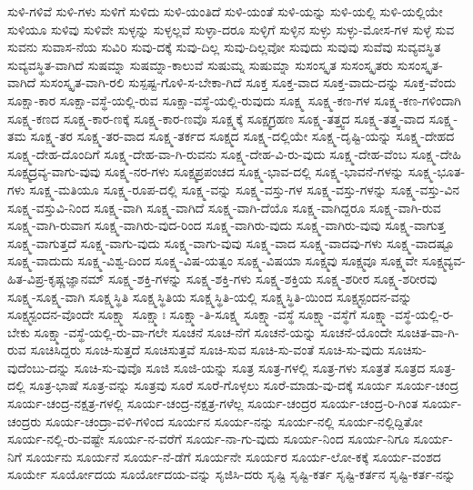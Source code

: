 {ಸುಳಿ-ಗಳಿವೆ
ಸುಳಿ-ಗಳು
ಸುಳಿಗೆ
ಸುಳಿದು
ಸುಳಿ-ಯಂತಿದೆ
ಸುಳಿ-ಯಂತೆ
ಸುಳಿ-ಯನ್ನು
ಸುಳಿ-ಯಲ್ಲಿ
ಸುಳಿ-ಯಲ್ಲಿಯೇ
ಸುಳಿಯೂ
ಸುಳಿವು
ಸುಳಿವೇ
ಸುಳ್ಳನ್ನು
ಸುಳ್ಳಲ್ಲವೆ
ಸುಳ್ಳಾ-ದರೂ
ಸುಳ್ಳಿಗೆ
ಸುಳ್ಳಿನ
ಸುಳ್ಳು
ಸುಳ್ಳು-ಮೋಸ-ಗಳ
ಸುಳ್ಳೆ
ಸುವ
ಸುವನು
ಸುವಾಸ-ನೆಯ
ಸುವಿರಿ
ಸುವು-ದಕ್ಕೆ
ಸುವು-ದಿಲ್ಲ
ಸುವು-ದಿಲ್ಲವೋ
ಸುವುದು
ಸುವುವು
ಸುವೆವು
ಸುವ್ಯವಸ್ಥಿತ
ಸುವ್ಯವಸ್ಥಿತ-ವಾಗಿದೆ
ಸುಷಮ್ನಾ
ಸುಷಮ್ನಾ-ಕಾಲುವೆ
ಸುಷುಮ್ನ
ಸುಷುಮ್ನಾ
ಸುಸಂಸ್ಕೃತ
ಸುಸಂಸ್ಕೃತರು
ಸುಸಂಸ್ಕೃತ-ವಾಗಿದೆ
ಸುಸಂಸ್ಕೃತ-ವಾಗಿ-ರಲಿ
ಸುಸ್ಪಷ್ಟ-ಗೊಳಿ-ಸ-ಬೇಕಾ-ಗಿದೆ
ಸೂಕ್ತ
ಸೂಕ್ತ-ವಾದ
ಸೂಕ್ತ-ವಾದು-ದನ್ನು
ಸೂಕ್ತ-ವೆಂದು
ಸೂಕ್ಷಾ-ಕಾರ
ಸೂಕ್ಷಾ-ವಸ್ಥೆ-ಯಲ್ಲಿ-ರುವ
ಸೂಕ್ಷಾ-ವಸ್ಥೆ-ಯಲ್ಲಿ-ರುವುದು
ಸೂಕ್ಷ್ಮ
ಸೂಕ್ಷ್ಮ-ಕಣ-ಗಳ
ಸೂಕ್ಷ್ಮ-ಕಣ-ಗಳಿಂದಾಗಿ
ಸೂಕ್ಷ್ಮ-ಕಣದ
ಸೂಕ್ಷ್ಮ-ಕಾರ-ಣಕ್ಕೆ
ಸೂಕ್ಷ್ಮ-ಕಾರ-ಣವೊ
ಸೂಕ್ಷ್ಮಕ್ಕೆ
ಸೂಕ್ಷ್ಮಗ್ರಹಣ
ಸೂಕ್ಷ್ಮ-ತತ್ತ್ವದ
ಸೂಕ್ಷ್ಮ-ತತ್ತ್ವ-ವಾದ
ಸೂಕ್ಷ್ಮ-ತಮ
ಸೂಕ್ಷ್ಮ-ತರ
ಸೂಕ್ಷ್ಮ-ತರ-ವಾದ
ಸೂಕ್ಷ್ಮ-ತರ್ಕದ
ಸೂಕ್ಷ್ಮದ
ಸೂಕ್ಷ್ಮ-ದಲ್ಲಿಯೇ
ಸೂಕ್ಷ್ಮ-ದೃಷ್ಟಿ-ಯನ್ನು
ಸೂಕ್ಷ್ಮ-ದೇಹದ
ಸೂಕ್ಷ್ಮ-ದೇಹ-ದೊಂದಿಗೆ
ಸೂಕ್ಷ್ಮ-ದೇಹ-ವಾ-ಗಿ-ರುವನು
ಸೂಕ್ಷ್ಮ-ದೇಹ-ವಿ-ರು-ವುದು
ಸೂಕ್ಷ್ಮ-ದೇಹ-ವೆಂಬ
ಸೂಕ್ಷ್ಮ-ದೇಹಿ
ಸೂಕ್ಷ್ಮದ್ರವ್ಯ-ವಾಗು-ವುವು
ಸೂಕ್ಷ್ಮ-ನರ-ಗಳು
ಸೂಕ್ಷ್ಮಪ್ರಪಂಚದ
ಸೂಕ್ಷ್ಮ-ಭಾವ-ದಲ್ಲಿ
ಸೂಕ್ಷ್ಮ-ಭಾವನೆ-ಗಳನ್ನು
ಸೂಕ್ಷ್ಮ-ಭೂತ-ಗಳು
ಸೂಕ್ಷ್ಮ-ಮತಿಯೂ
ಸೂಕ್ಷ್ಮ-ರೂಪ-ದಲ್ಲಿ
ಸೂಕ್ಷ್ಮ-ವನ್ನು
ಸೂಕ್ಷ್ಮ-ವಸ್ತು-ಗಳ
ಸೂಕ್ಷ್ಮ-ವಸ್ತು-ಗಳನ್ನು
ಸೂಕ್ಷ್ಮ-ವಸ್ತು-ವಿನ
ಸೂಕ್ಷ್ಮ-ವಸ್ತುವಿ-ನಿಂದ
ಸೂಕ್ಷ್ಮ-ವಾಗಿ
ಸೂಕ್ಷ್ಮ-ವಾಗಿದೆ
ಸೂಕ್ಷ್ಮ-ವಾಗಿ-ದೆಯೊ
ಸೂಕ್ಷ್ಮ-ವಾಗಿದ್ದರೂ
ಸೂಕ್ಷ್ಮ-ವಾಗಿ-ರುವ
ಸೂಕ್ಷ್ಮ-ವಾಗಿ-ರುವಾಗ
ಸೂಕ್ಷ್ಮ-ವಾಗಿರು-ವುದ-ರಿಂದ
ಸೂಕ್ಷ್ಮ-ವಾಗಿರು-ವುದು
ಸೂಕ್ಷ್ಮ-ವಾಗಿರು-ವುವು
ಸೂಕ್ಷ್ಮ-ವಾಗುತ್ತ
ಸೂಕ್ಷ್ಮ-ವಾಗುತ್ತದೆ
ಸೂಕ್ಷ್ಮ-ವಾಗು-ವುದು
ಸೂಕ್ಷ್ಮ-ವಾಗು-ವುವು
ಸೂಕ್ಷ್ಮ-ವಾದ
ಸೂಕ್ಷ್ಮ-ವಾದವು-ಗಳು
ಸೂಕ್ಷ್ಮ-ವಾದಷ್ಟೂ
ಸೂಕ್ಷ್ಮ-ವಾದುದು
ಸೂಕ್ಷ್ಮ-ವಿಶ್ವ-ದಿಂದ
ಸೂಕ್ಷ್ಮ-ವಿಷ-ಯತ್ವಂ
ಸೂಕ್ಷ್ಮ-ವಿಷಯಾ
ಸೂಕ್ಷ್ಮವು
ಸೂಕ್ಷ್ಮವೂ
ಸೂಕ್ಷ್ಮವೇ
ಸೂಕ್ಷ್ಮವ್ಯವ-ಹಿತ-ವಿಪ್ರ-ಕೃಷ್ಣಜ್ಞಾನಮ್
ಸೂಕ್ಷ್ಮ-ಶಕ್ತಿ-ಗಳನ್ನು
ಸೂಕ್ಷ್ಮ-ಶಕ್ತಿ-ಗಳು
ಸೂಕ್ಷ್ಮ-ಶಕ್ತಿಯ
ಸೂಕ್ಷ್ಮ-ಶರೀರ
ಸೂಕ್ಷ್ಮ-ಶರೀರವು
ಸೂಕ್ಷ್ಮ-ಸೂಕ್ಷ್ಮ-ವಾಗಿ
ಸೂಕ್ಷ್ಮಸ್ಥಿತಿ
ಸೂಕ್ಷ್ಮಸ್ಥಿತಿಯ
ಸೂಕ್ಷ್ಮಸ್ಥಿತಿ-ಯಲ್ಲಿ
ಸೂಕ್ಷ್ಮಸ್ಥಿತಿ-ಯಿಂದ
ಸೂಕ್ಷ್ಮಸ್ಪಂದನ-ವನ್ನು
ಸೂಕ್ಷ್ಮಸ್ಪಂದನ-ವೊಂದೇ
ಸೂಕ್ಷ್ಮಾ
ಸೂಕ್ಷ್ಮಾಃ
ಸೂಕ್ಷ್ಮಾ-ತಿ-ಸೂಕ್ಷ್ಮ
ಸೂಕ್ಷ್ಮಾ-ವಸ್ಥೆ
ಸೂಕ್ಷ್ಮಾ-ವಸ್ಥೆಗೆ
ಸೂಕ್ಷ್ಮಾ-ವಸ್ಥೆ-ಯಲ್ಲಿ-ರ-ಬೇಕು
ಸೂಕ್ಷ್ಮಾ-ವಸ್ಥೆ-ಯಲ್ಲಿ-ರು-ವಾ-ಗಲೇ
ಸೂಚನೆ
ಸೂಚ-ನೆಗೆ
ಸೂಚನೆ-ಯನ್ನು
ಸೂಚನೆ-ಯೊಂದೇ
ಸೂಚಿತ-ವಾ-ಗಿ-ರುವ
ಸೂಚಿಸಿದ್ದರು
ಸೂಚಿ-ಸುತ್ತದೆ
ಸೂಚಿಸುತ್ತವೆ
ಸೂಚಿ-ಸುವ
ಸೂಚಿ-ಸು-ವಂತೆ
ಸೂಚಿ-ಸು-ವುದು
ಸೂಚಿಸು-ವುದೆಂಬು-ದನ್ನು
ಸೂಚಿ-ಸು-ವುವೊ
ಸೂಜಿ
ಸೂಜಿ-ಯನ್ನು
ಸೂತ್ರ
ಸೂತ್ರ-ಗಳಲ್ಲಿ
ಸೂತ್ರ-ಗಳು
ಸೂತ್ರತೆ
ಸೂತ್ರದ
ಸೂತ್ರ-ದಲ್ಲಿ
ಸೂತ್ರ-ಭಾಷೆ
ಸೂತ್ರ-ವನ್ನು
ಸೂತ್ರವು
ಸೂರೆ
ಸೂರೆ-ಗೊಳ್ಳಲು
ಸೂರೆ-ಮಾಡು-ವು-ದಕ್ಕೆ
ಸೂರ್ಯ
ಸೂರ್ಯ-ಚಂದ್ರ
ಸೂರ್ಯ-ಚಂದ್ರ-ನಕ್ಷತ್ರ-ಗಳಲ್ಲಿ
ಸೂರ್ಯ-ಚಂದ್ರ-ನಕ್ಷತ್ರ-ಗಳೆಲ್ಲ
ಸೂರ್ಯ-ಚಂದ್ರರ
ಸೂರ್ಯ-ಚಂದ್ರ-ರಿ-ಗಿಂತ
ಸೂರ್ಯ-ಚಂದ್ರರು
ಸೂರ್ಯ-ಚಂದ್ರಾ-ವಳಿ-ಗಳಿಂದ
ಸೂರ್ಯನ
ಸೂರ್ಯ-ನನ್ನು
ಸೂರ್ಯ-ನಲ್ಲಿ
ಸೂರ್ಯ-ನಲ್ಲಿದ್ದಿತೋ
ಸೂರ್ಯ-ನಲ್ಲಿ-ರು-ವಷ್ಟೇ
ಸೂರ್ಯ-ನ-ವರೆಗೆ
ಸೂರ್ಯ-ನಾ-ಗು-ವುದು
ಸೂರ್ಯ-ನಿಂದ
ಸೂರ್ಯ-ನಿಗೂ
ಸೂರ್ಯ-ನಿಗೆ
ಸೂರ್ಯನು
ಸೂರ್ಯನೆ
ಸೂರ್ಯ-ನೆ-ಡೆಗೆ
ಸೂರ್ಯನೇ
ಸೂರ್ಯರ
ಸೂರ್ಯ-ಲೋ-ಕಕ್ಕೆ
ಸೂರ್ಯ-ವಂಶದ
ಸೂರ್ಯೇ
ಸೂರ್ಯೋದಯ
ಸೂರ್ಯೋದಯ-ವನ್ನು
ಸೃಜಿಸಿ-ದರು
ಸೃಷ್ಟಿ
ಸೃಷ್ಟಿ-ಕರ್ತ
ಸೃಷ್ಟಿ-ಕರ್ತನ
ಸೃಷ್ಟಿ-ಕರ್ತ-ನನ್ನು
}

